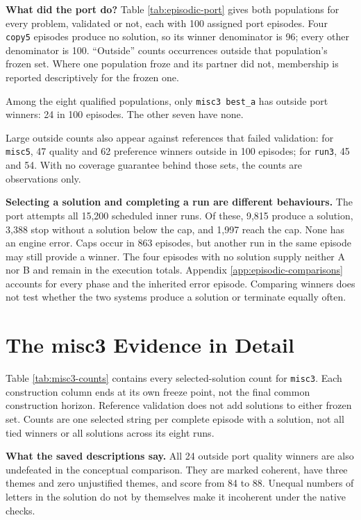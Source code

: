 \documentclass[10pt,letterpaper]{article}
\begin{document}
\textbf{What did the port do?} Table \ref{tab:episodic-port} gives both populations for
every problem, validated or not, each with 100 assigned port episodes. Four \texttt{copy5}
episodes produce no solution, so its winner denominator is 96; every other denominator is
100. ``Outside'' counts occurrences outside that population's frozen set. Where one
population froze and its partner did not, membership is reported descriptively for the
frozen one.



Among the eight qualified populations, only \texttt{misc3\ best\_a} has outside port
winners: 24 in 100 episodes. The other seven have none.

Large outside counts also appear against references that failed validation: for
\texttt{misc5}, 47 quality and 62 preference winners outside in 100 episodes; for
\texttt{run3}, 45 and 54. With no coverage guarantee behind those sets, the counts are
observations only.

\textbf{Selecting a solution and completing a run are different behaviours.} The port
attempts all 15,200 scheduled inner runs. Of these, 9,815 produce a solution, 3,388 stop
without a solution below the cap, and 1,997 reach the cap. None has an engine error. Caps
occur in 863 episodes, but another run in the same episode may still provide a winner. The
four episodes with no solution supply neither A nor B and remain in the execution totals.
Appendix \ref{app:episodic-comparisons} accounts for every phase and the inherited error
episode. Comparing winners does not test whether the two systems produce a solution or
terminate equally often.

\clearpage

\section{The misc3 Evidence in Detail}\label{app:misc3}

Table \ref{tab:misc3-counts} contains every selected-solution count for \texttt{misc3}.
Each construction column ends at its own freeze point, not the final common construction
horizon. Reference validation does not add solutions to either frozen set. Counts are one
selected string per complete episode with a solution, not all tied winners or all
solutions across its eight runs.



\textbf{What the saved descriptions say.} All 24 outside port quality winners are also
undefeated in the conceptual comparison. They are marked coherent, have three themes and
zero unjustified themes, and score from 84 to 88. Unequal numbers of letters in the
solution do not by themselves make it incoherent under the native checks.
\end{document}
